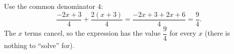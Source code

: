 Use the common denominator $4$:
\[
\dfrac{-2x+3}{4}+\dfrac{2(x+3)}{4}=\dfrac{-2x+3+2x+6}{4}=\boxed{\dfrac{9}{4}} .
\]
The $x$ terms cancel, so the expression has the value $\dfrac{9}{4}$ for every $x$ (there is nothing to ``solve'' for).
